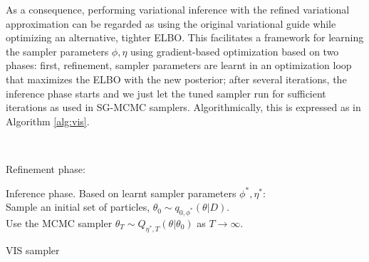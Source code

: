 As a consequence, performing variational inference with the refined variational approximation can be regarded as using the original variational guide while optimizing an alternative, tighter ELBO.  
This facilitates a framework for learning the sampler parameters $\phi, \eta$ using gradient-based optimization based 
on two phases: first,
 refinement, sampler parameters are learnt in an optimization loop that maximizes the ELBO with the new posterior;
after several iterations, the inference  phase 
starts and we just let the tuned sampler run for
sufficient iterations as used in SG-MCMC samplers. Algorithmically,
this is expressed as in Algorithm \ref{alg:vis}.

{\tt
\begin{algorithm}[H]
Refinement phase: \\

Inference phase. Based on learnt sampler parameters $\phi^*, \eta^*$:\\
\quad Sample an initial set of particles, $\theta _0 \sim q_{0,\phi^*}(\theta |D)$. \\
\quad  Use the MCMC sampler $\theta _T \sim Q_{\eta^*, T}(\theta |\theta _0)$ as $T \rightarrow \infty$.
 \caption{VIS sampler}\label{alg:vis}
\end{algorithm}
}


